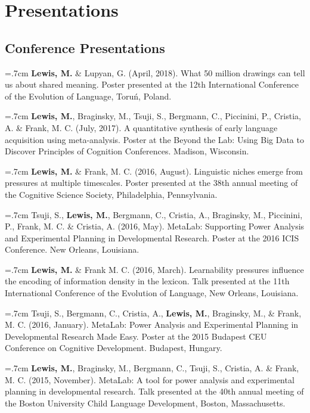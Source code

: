 \documentclass[letterpaper]{article}
\begin{document}
\section*{Presentations}
\onehalfspacing

\subsection*{Conference Presentations}


 \hangindent=.7cm {\bf Lewis, M.} \& Lupyan, G. (April, 2018). What 50 million drawings can tell us about shared meaning. Poster presented at the 12th International Conference of the Evolution of Language, Toru\'{n}, Poland.

 \hangindent=.7cm {\bf Lewis, M.}, Braginsky, M., Tsuji, S., Bergmann, C., Piccinini, P., Cristia, A. \& Frank, M. C. (July, 2017). A quantitative synthesis of early language acquisition using meta-analysis. Poster at the Beyond the Lab: Using Big Data to Discover Principles of Cognition Conferences. Madison, Wisconsin.

\hangindent=.7cm {\bf Lewis, M.} \& Frank, M. C. (2016, August).  Linguistic niches emerge from pressures at multiple timescales. Poster presented at the 38th annual meeting of the Cognitive Science Society, Philadelphia, Pennsylvania.

 \hangindent=.7cm  Tsuji, S., {\bf Lewis, M.}, Bergmann, C., Cristia, A.,  Braginsky, M.,  Piccinini, P., Frank, M. C. \& Cristia, A. (2016, May). MetaLab: Supporting Power Analysis and Experimental Planning in Developmental Research. Poster at the 2016 ICIS Conference. New Orleans, Louisiana.


  \hangindent=.7cm {\bf Lewis, M.} \& Frank M. C. (2016, March). Learnability pressures influence the encoding of information density in the lexicon. Talk presented at the 11th International Conference of the Evolution of Language, New Orleans, Louisiana.
  
  \hangindent=.7cm  Tsuji, S., Bergmann, C., Cristia, A., {\bf Lewis, M.}, Braginsky, M., \& Frank, M. C. (2016, January). MetaLab: Power Analysis and Experimental Planning in Developmental Research Made Easy. Poster at the 2015 Budapest CEU Conference on Cognitive Development. Budapest, Hungary.


\hangindent=.7cm {\bf Lewis, M.},  Braginsky,  M.,  Bergmann, C., Tsuji, S., Cristia, A. \& Frank, M. C. (2015, November). MetaLab: A tool for power analysis and experimental planning in developmental research. Talk presented at the 40th annual meeting of the Boston University Child Language Development, Boston, Massachusetts.
\end{document}
